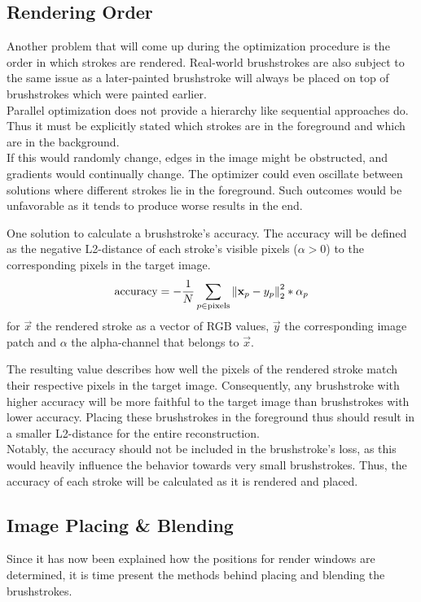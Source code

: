\subsection{Rendering Order}
Another problem that will come up during the optimization procedure is the order in which strokes are rendered.
Real-world brushstrokes are also subject to the same issue as a later-painted brushstroke will always be placed on top of brushstrokes which were painted earlier.\\
Parallel optimization does not provide a hierarchy like sequential approaches do.
Thus it must be explicitly stated which strokes are in the foreground and which are in the background.\\
If this would randomly change, edges in the image might be obstructed, and gradients would continually change.
The optimizer could even oscillate between solutions where different strokes lie in the foreground.
Such outcomes would be unfavorable as it tends to produce worse results in the end.

One solution to calculate a brushstroke's accuracy.
The accuracy will be defined as the negative L2-distance of each stroke's visible pixels ($\alpha > 0$) to the corresponding pixels in the target image.
\begin{align}
    \text{accuracy} = - \frac{1}{N} \sum_{p \in \text{pixels}} \left\lVert\mathbf{x}_p - y_p\right\rVert_2^2 * \alpha_p
\end{align}
for $\vec{x}$ the rendered stroke as a vector of RGB values, $\vec{y}$ the corresponding image patch and $\alpha$ the alpha-channel that belongs to $\vec{x}$.

The resulting value describes how well the pixels of the rendered stroke match their respective pixels in the target image.
Consequently, any brushstroke with higher accuracy will be more faithful to the target image than brushstrokes with lower accuracy.
Placing these brushstrokes in the foreground thus should result in a smaller L2-distance for the entire reconstruction.\\
Notably, the accuracy should not be included in the brushstroke's loss, as this would heavily influence the behavior towards very small brushstrokes.
Thus, the accuracy of each stroke will be calculated as it is rendered and placed.

\subsection[Placing \& Blending]{Image Placing \& Blending}
Since it has now been explained how the positions for render windows are determined, it is time present the methods behind placing and blending the brushstrokes.\\

